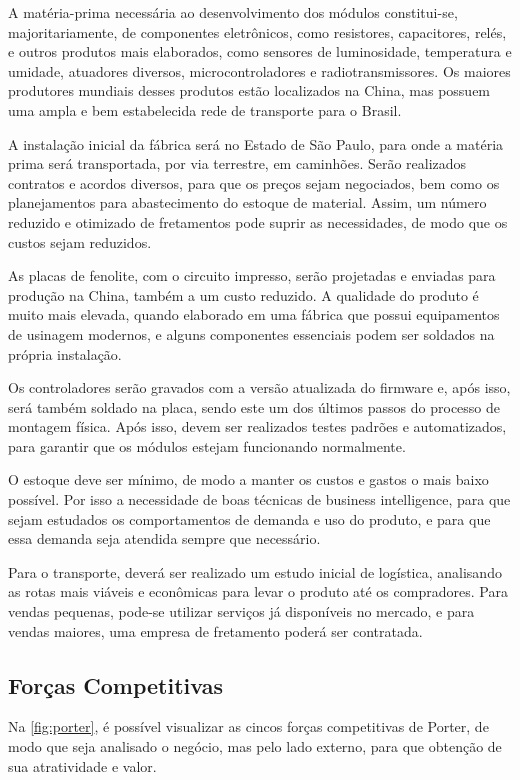 A matéria-prima necessária ao desenvolvimento dos módulos constitui-se, majoritariamente, de componentes eletrônicos, como resistores, capacitores, relés, e outros produtos mais elaborados, como sensores de luminosidade, temperatura e umidade, atuadores diversos, microcontroladores  e radiotransmissores. Os maiores produtores mundiais desses produtos estão localizados na China, mas possuem uma ampla e bem estabelecida rede de transporte para o Brasil.

A instalação inicial da fábrica será no Estado de São Paulo, para onde a matéria prima será transportada, por via terrestre, em caminhões. Serão realizados contratos e acordos diversos, para que os preços sejam negociados, bem como os planejamentos para abastecimento do estoque de material. Assim, um número reduzido e otimizado de fretamentos pode suprir as necessidades, de modo que os custos sejam reduzidos.

As placas de fenolite, com o circuito impresso, serão projetadas e enviadas para produção na China, também a um custo reduzido. A qualidade do produto é muito mais elevada, quando elaborado em uma fábrica que possui equipamentos de usinagem modernos, e alguns componentes essenciais podem ser soldados na própria instalação.

Os controladores serão gravados com a versão atualizada do firmware e, após isso, será também soldado na placa, sendo este um dos últimos passos do processo de montagem física. Após isso, devem ser realizados testes padrões e automatizados, para garantir que os módulos estejam funcionando normalmente.

O estoque deve ser mínimo, de modo a manter os custos e gastos o mais baixo possível. Por isso a necessidade de boas técnicas de business intelligence, para que sejam estudados os comportamentos de demanda e uso do produto, e para que essa demanda seja atendida sempre que necessário.

Para o transporte, deverá ser realizado um estudo inicial de logística, analisando as rotas mais viáveis e econômicas para levar o produto até os compradores. Para vendas pequenas, pode-se utilizar serviços já disponíveis no mercado, e para vendas maiores, uma empresa de fretamento poderá ser contratada.

\subsection{Forças Competitivas}

Na \autoref{fig:porter}, é possível visualizar as cincos forças competitivas de Porter, de modo que seja analisado o negócio, mas pelo lado externo, para que obtenção de sua atratividade e valor.

